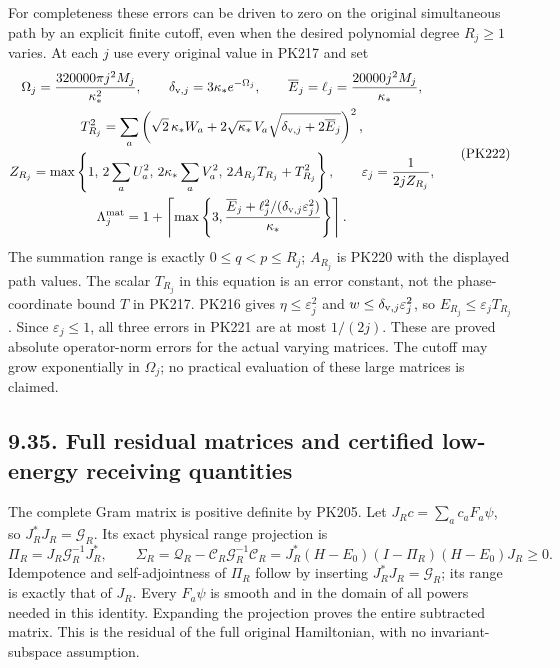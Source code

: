 \documentclass[11pt]{article}
\begin{document}
For completeness these errors can be driven to zero on the
original simultaneous path by an explicit finite cutoff,
even when the desired polynomial degree \(R_j\ge1\) varies.
At each \(j\) use every original value in PK217 and set
\[
 \begin{gathered}
 \Omega_j=\frac{320000\pi j^2M_j}{\kappa_*^2},\qquad
 \delta_{{\rm v},j}=3\kappa_*e^{-\Omega_j},\qquad
 \overline E_j=\ell_j=\frac{20000j^2M_j}{\kappa_*},\\
 T_{R_j}^2=\sum_a
    \left(\sqrt2\,\kappa_*W_a+
             2\sqrt{\kappa_*}\,V_a
                      \sqrt{\delta_{{\rm v},j}+2\overline E_j}\right)^2,\\
 Z_{R_j}=\max\left\{1,\,
       2\sum_aU_a^2,\,2\kappa_*\sum_aV_a^2,\,
       2A_{R_j}T_{R_j}+T_{R_j}^2\right\},\qquad
 \varepsilon_j=\frac1{2jZ_{R_j}},\\
 \Lambda^{\rm mat}_j
 =1+\left\lceil\max\left\{
 3,\frac{\overline E_j+
          \ell_j^2/(\delta_{{\rm v},j}\varepsilon_j^2)}
                 {\kappa_*}\right\}\right\rceil .
 \end{gathered}\tag{PK222}
\]
The summation range is exactly \(0\le q<p\le R_j\);
\(A_{R_j}\) is PK220 with the displayed path values.
The scalar \(T_{R_j}\) in this equation is an error constant,
not the phase-coordinate bound \(T\) in PK217.
PK216 gives \(\eta\le\varepsilon_j^2\) and
\(w\le\delta_{{\rm v},j}\varepsilon_j^2\), so
\(E_{R_j}\le\varepsilon_jT_{R_j}\).
Since \(\varepsilon_j\le1\), all three errors in PK221 are
at most \(1/(2j)\). These are proved absolute operator-norm
errors for the actual varying matrices. The cutoff may
grow exponentially in \(\Omega_j\); no practical evaluation
of these large matrices is claimed.

\subsection*{9.35. Full residual matrices and certified low-energy receiving quantities}

The complete Gram matrix is positive definite by PK205.
Let \(J_Rc=\sum_ac_aF_a\psi\), so \(J_R^*J_R=\mathcal G_R\).
Its exact physical range projection is
\[
 \Pi_R=J_R\mathcal G_R^{-1}J_R^*,\qquad
 \Sigma_R=\mathcal Q_R
               -\mathcal C_R\mathcal G_R^{-1}\mathcal C_R
       =J_R^*(H-E_0)(I-\Pi_R)(H-E_0)J_R\ge0 .
 \tag{PK223}
\]
Idempotence and self-adjointness of \(\Pi_R\) follow by
inserting \(J_R^*J_R=\mathcal G_R\); its range is exactly
that of \(J_R\). Every \(F_a\psi\) is smooth and in the
domain of all powers needed in this identity. Expanding
the projection proves the entire subtracted matrix.
This is the residual of the full original Hamiltonian,
with no invariant-subspace assumption.
\end{document}
